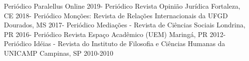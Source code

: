 \begin{cvhonors}
  \cvhonor
    {Periódico}
    {Paralellus}
    {Online}
    {2019-}
  \cvhonor
    {Periódico}
    {Revista Opinião Jurídica}
    {Fortaleza, CE}
    {2018-}
  \cvhonor
    {Periódico}
    {Monções: Revista de Relações Internacionais da UFGD}
    {Dourados, MS}
    {2017-}
  \cvhonor
    {Periódico}
    {Mediações - Revista de Ciências Sociais}
    {Londrina, PR}
    {2016-}
  \cvhonor
    {Periódico}
    {Revista Espaço Acadêmico (UEM)}
    {Maringá, PR}
    {2012-}
  \cvhonor
    {Periódico}
    {Idéias - Revista do Instituto de Filosofia e Ciências Humanas da UNICAMP}
    {Campinas, SP}
    {2010-2010}
\end{cvhonors}
